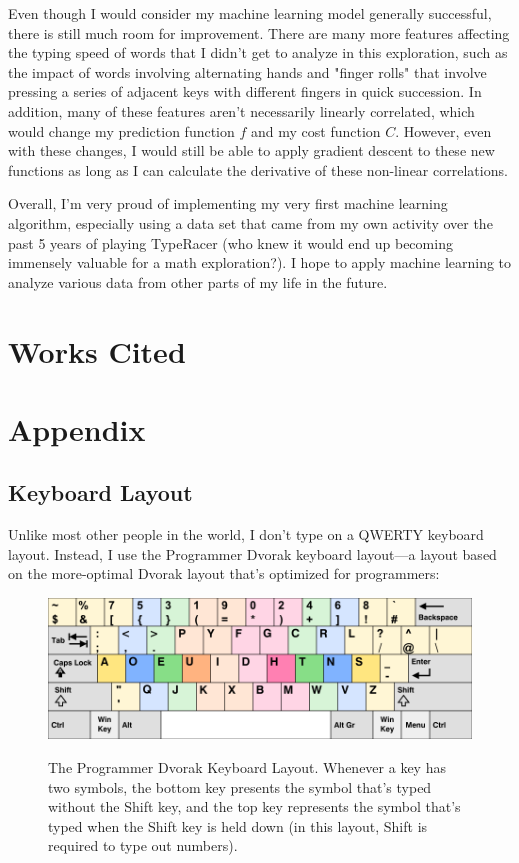 \documentclass[12pt]{article}
\begin{document}
Even though I would consider my machine learning model generally successful, there is still much room for improvement. There are many more features affecting the typing speed of words that I didn't get to analyze in this exploration, such as the impact of words involving alternating hands and "finger rolls" that involve pressing a series of adjacent keys with different fingers in quick succession. In addition, many of these features aren't necessarily linearly correlated, which would change my prediction function $f$ and my cost function $C$. However, even with these changes, I would still be able to apply gradient descent to these new functions as long as I can calculate the derivative of these non-linear correlations.

Overall, I'm very proud of implementing my very first machine learning algorithm, especially using a data set that came from my own activity over the past 5 years of playing TypeRacer (who knew it would end up becoming immensely valuable for a math exploration?). I hope to apply machine learning to analyze various data from other parts of my life in the future.

\newpage

\section*{Works Cited}

\newpage

\section*{Appendix}

\subsection*{Keyboard Layout}

Unlike most other people in the world, I don't type on a QWERTY keyboard layout. Instead, I use the Programmer Dvorak keyboard layout—a layout based on the more-optimal Dvorak layout that's optimized for programmers:
\begin{figure}[H]
	\caption{The Programmer Dvorak Keyboard Layout. Whenever a key has two symbols, the bottom key presents the symbol that's typed without the Shift key, and the top key represents the symbol that's typed when the Shift key is held down (in this layout, Shift is required to type out numbers).}
	\includegraphics[width=\textwidth]{programmer-dvorak.png}
	\label{fig:programmer-dvorak}
\end{figure}
\end{document}

